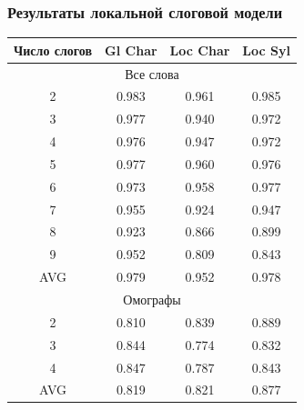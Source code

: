\documentclass[russian]{beamer}
\begin{document}
\begin{frame}
\frametitle{Результаты локальной слоговой модели} 
\begin{table}[H]	
	\begin{small}
		\begin{center}
			\begin{tabular}{|c|c|c|c|}
				\hline
				Число слогов & Gl Char & Loc Char & Loc Syl \\ \hline
							\multicolumn{4}{|c|}{Все слова}                          \\ \hline
				
				2       &       0.983       &      0.961       &      0.985      \\ \hline
				3       &       0.977       &      0.940       &      0.972      \\ \hline
				4       &       0.976       &      0.947       &      0.972      \\ \hline
				5       &       0.977       &      0.960       &      0.976      \\ \hline
				6       &       0.973       &      0.958       &      0.977      \\ \hline
				7       &       0.955       &      0.924       &      0.947      \\ \hline
				8       &       0.923       &      0.866       &      0.899      \\ \hline
				9       &       0.952       &      0.809       &      0.843      \\ \hline
				AVG    &       0.979       &      0.952       &      0.978      \\ \hline
							\multicolumn{4}{|c|}{Омографы}                          \\ \hline
				
				2       &       0.810       &      0.839       &      0.889      \\ \hline
				3       &       0.844       &      0.774       &      0.832      \\ \hline
				4       &       0.847       &      0.787       &      0.843      \\ \hline
				AVG    &       0.819       &      0.821       &      0.877      \\ \hline
			\end{tabular}
		\end{center}
	\end{small}
\end{table}	

\end{frame}
\end{document}
